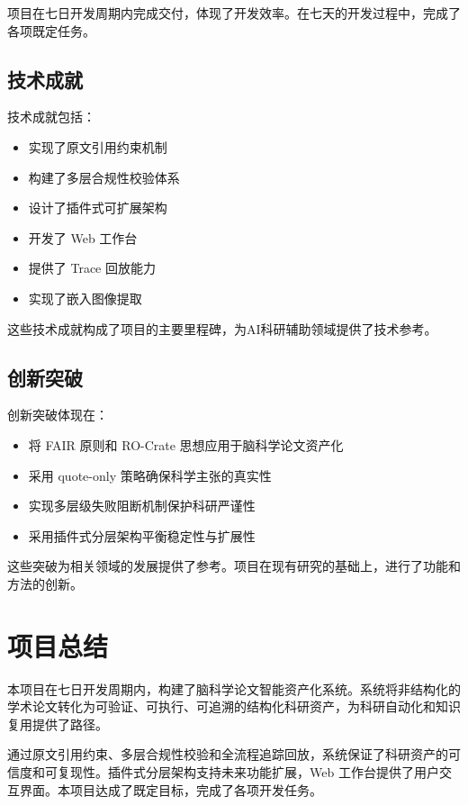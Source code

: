 ﻿\documentclass[a4paper,12pt]{article}
\begin{document}
项目在七日开发周期内完成交付，体现了开发效率。在七天的开发过程中，完成了各项既定任务。

\subsection{技术成就}

技术成就包括：

\begin{itemize}
    \item 实现了原文引用约束机制
    \item 构建了多层合规性校验体系
    \item 设计了插件式可扩展架构
    \item 开发了 Web 工作台
    \item 提供了 Trace 回放能力
    \item 实现了嵌入图像提取
\end{itemize}

这些技术成就构成了项目的主要里程碑，为AI科研辅助领域提供了技术参考。

\subsection{创新突破}

创新突破体现在：

\begin{itemize}
    \item 将 FAIR 原则和 RO-Crate 思想应用于脑科学论文资产化
    \item 采用 quote-only 策略确保科学主张的真实性
    \item 实现多层级失败阻断机制保护科研严谨性
    \item 采用插件式分层架构平衡稳定性与扩展性
\end{itemize}

这些突破为相关领域的发展提供了参考。项目在现有研究的基础上，进行了功能和方法的创新。

\section{项目总结}

本项目在七日开发周期内，构建了脑科学论文智能资产化系统。系统将非结构化的学术论文转化为可验证、可执行、可追溯的结构化科研资产，为科研自动化和知识复用提供了路径。

通过原文引用约束、多层合规性校验和全流程追踪回放，系统保证了科研资产的可信度和可复现性。插件式分层架构支持未来功能扩展，Web 工作台提供了用户交互界面。本项目达成了既定目标，完成了各项开发任务。
\end{document}
